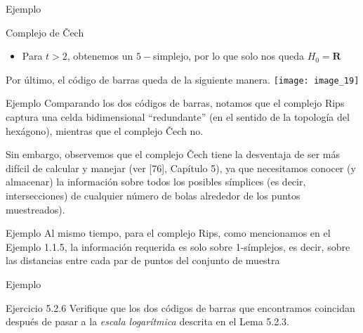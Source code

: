 \documentclass{beamer}
\newcounter{Ejercicio}
\begin{document}
\begin{frame}{Ejemplo}
    \begin{block}{Complejo de \v{C}ech}
       \begin{itemize}
           \item Para $t > 2$, obtenemos un $5-$simplejo, por lo que solo nos queda $H_0=\mathbf{R}$\\
       \end{itemize}
    \end{block}
    Por último, el código de barras queda de la siguiente manera.
    \newline
    \pause
    \texttt{[image: image\_19]}
\end{frame}

\begin{frame}{Ejemplo}
    Comparando los dos códigos de barras, notamos que el complejo Rips captura una celda bidimensional “redundante” (en el sentido de la topología del hexágono), mientras que el complejo \v{C}ech no. 
    \newline
    \pause

    \newline
    Sin embargo, observemos que el complejo \v{C}ech tiene la desventaja de ser más difícil de calcular y manejar (ver [76], Capítulo 5), ya que necesitamos conocer (y almacenar) la información sobre todos los posibles símplices (es decir, intersecciones) de cualquier número de bolas alrededor de los puntos muestreados).\\ 
\end{frame}

\begin{frame}{Ejemplo}
    Al mismo tiempo, para el complejo Rips, como mencionamos en el Ejemplo 1.1.5, la información requerida es solo sobre 1-símplejos, es decir, sobre las distancias entre cada par de puntos del conjunto de muestra  
\end{frame}

\begin{frame}{Ejemplo}
    \begin{block}{Ejercicio 5.2.6}
       Verifique que los dos códigos de barras que encontramos coincidan después de pasar a la \textit{escala logarítmica} descrita en el Lema 5.2.3.
    \end{block}
\end{frame}
\end{document}
